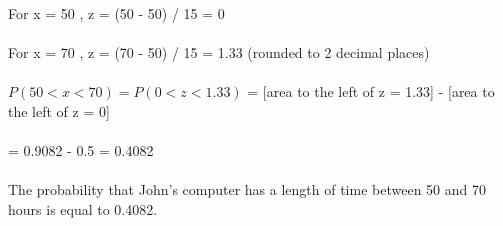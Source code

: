 \documentclass{book}
\begin{document}
\begin{enumerate}
For x = 50 , z = (50 - 50) / 15 = 0 \\\\
For x = 70 , z = (70 - 50) / 15 = 1.33 (rounded to 2 decimal places) \\\\
$P( 50< x < 70) = P( 0< z < 1.33)$ = [area to the left of z = 1.33] - [area to the left of z = 0] \\\\
= 0.9082 - 0.5 = 0.4082 \\\\
The probability that John's computer has a length of time between 50 and 70 hours is equal to 0.4082.
	\end{enumerate}
\end{document}
